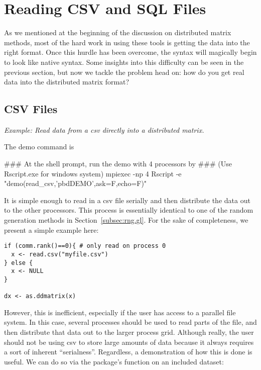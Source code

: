 \chapter{Reading CSV and SQL Files}
\label{sec:reader}

As we mentioned at the beginning of the discussion on distributed matrix methods, most of the hard work in using these tools is getting the data into the right format.  Once this hurdle has been overcome, the syntax will magically begin to look like native  syntax.  Some insights into this difficulty can be seen in the previous section, but now we tackle the problem head on:  how do you get real data into the distributed matrix format?

\section{CSV Files}
\label{sec:csv_files}

\emph{Example:  Read data from a csv directly into a distributed matrix.}

The demo command is
\begin{Command}
### At the shell prompt, run the demo with 4 processors by
### (Use Rscript.exe for windows system)
mpiexec -np 4 Rscript -e "demo(read_csv,'pbdDEMO',ask=F,echo=F)"
\end{Command}

It is simple enough to read in a csv file serially and then distribute the data out to the other processors.  This process is essentially identical to one of the random generation methods in Section~\ref{subsec:rng.gl}.  For the sake of completeness, we present a simple example here:

\begin{lstlisting}[language=rr]
if (comm.rank()==0){ # only read on process 0
  x <- read.csv("myfile.csv")
} else {
  x <- NULL
}

dx <- as.ddmatrix(x)
\end{lstlisting}

However, this is inefficient, especially if the user has access to a parallel file system.  In this case, several processes should be used to read parts of the file, and then distribute that data out to the larger process grid.  Although really, the user should not be using csv to store large amounts of data because it always requires a sort of inherent ``serialness''.  Regardless, a demonstration of how this is done is useful.  We can do so via the  package's function  on an included dataset:

